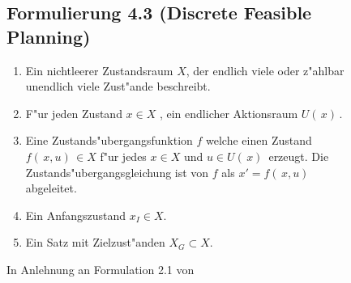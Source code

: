 \begin{figure}
\centering
\subsection*{Formulierung 4.3 (Discrete Feasible Planning)}
\begin{enumerate}
	\item Ein nichtleerer Zustandsraum $X$, der endlich viele oder z"ahlbar unendlich viele Zust"ande beschreibt.  
	\item F"ur jeden Zustand $x \in X$ , ein endlicher Aktionsraum $U( \, x) \,$.
	\item Eine Zustands"ubergangsfunktion $f$ welche einen Zustand  $f( \, x,u) \, \in X$ f"ur jedes $x \in X$  und $u \in U( \, x) \,$ erzeugt. Die Zustands"ubergangsgleichung ist von $f$ als $x' = f( \, x,u )\, $ abgeleitet.
	\item Ein Anfangszustand $ x_{I} \in X$.
	\item Ein Satz mit Zielzust"anden $X_{G} \subset X$.
\end{enumerate}
\caption{In Anlehnung an Formulation 2.1 von \cite[~S. 29]{Lav06}}
\label{lav03}
\end{figure}


%

